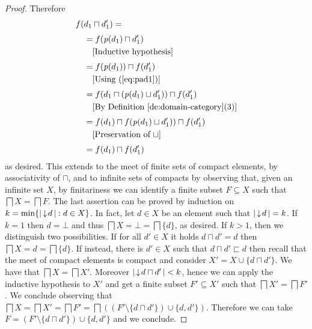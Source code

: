 \begin{proof}
  Therefore
  \begin{align*}
    & f(d_1 \sqcap d_1') =\\[1mm]
    & \quad = f(\mathit{p}({d_1}) \sqcap d_1')\\
    & \qquad \mbox{[Inductive hypothesis]}\\[1mm]
    & \quad =f(\mathit{p}({d_1})) \sqcap f(d_1')\\
    & \qquad \mbox{[Using~(\ref{eq:pad1})]}\\[1mm]
    & \quad = f(d_1 \sqcap (\mathit{p}({d_1}) \sqcup d_1')) \sqcap f(d_1')\\
    & \qquad \mbox{[By Definition~\ref{de:domain-category}(3)]}\\[1mm]
    & \quad = f(d_1) \sqcap f(\mathit{p}({d_1}) \sqcup d_1')) \sqcap f(d_1')\\
    & \qquad \mbox{[Preservation of $\sqcup$]}\\[1mm]
    & \quad = f(d_1) \sqcap f(d_1')
  \end{align*}
  as desired. This extends to the meet of finite sets of compact elements, by
  associativity of $\sqcap$, and to 
  infinite sets of compacts by observing that, given an infinite set
  $X$, by finitariness we can identify a finite subset $F \subseteq X$
  such that $\bigsqcap X = \bigsqcap F$.
  The last assertion can be proved by induction on
  $k = \min \{ |\mathop{\downarrow\!{d}}| : d \in X \}$. In fact, let $d \in X$
  be an element such that $|\mathop{\downarrow\!{d}}| = k$. If {$k=1$} then
  $d = \bot$ and thus $\bigsqcap X = \bot = \bigsqcap \{ d \}$, as
  desired. If {$k >1$}, then we distinguish two possibilities. If for
  all $d' \in X$ it holds $d \sqcap d' = d$ then
  $\bigsqcap X = d = \bigsqcap \{d\}$. If instead, there is $d' \in X$
  such that $d \sqcap d' \sqsubset d$ then recall that the meet of
  compact elements is compact and consider
  $X' = X \cup \{ d \sqcap d' \}$. We have that
  $\bigsqcap X = \bigsqcap X'$. Moreover
  $|\mathop{\downarrow\!{d \sqcap d'}}| < k$, hence we can apply the inductive
  hypothesis to $X'$ and get a finite subset $F' \subseteq X'$ such
  that $\bigsqcap X' = \bigsqcap F'$. We conclude observing that
  $\bigsqcap X = \bigsqcap X' = \bigsqcap F' = \bigsqcap ((F'
  \setminus \{d \sqcap d'\}) \cup \{ d, d'\})$. Therefore we can take
  $F = (F' \setminus \{d \sqcap d'\}) \cup \{ d, d'\}$ and we
  conclude.
\end{proof}




